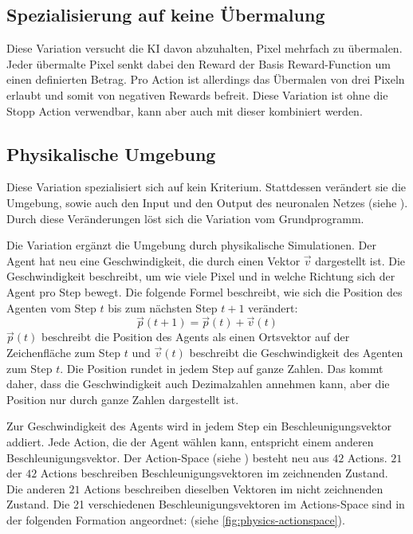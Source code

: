 \subsection{Spezialisierung auf keine Übermalung}\label{sub:m_var_overdraw}
Diese Variation versucht die KI davon abzuhalten, Pixel mehrfach zu übermalen.
Jeder übermalte Pixel senkt dabei den Reward der Basis Reward-Function um einen
definierten Betrag. Pro Action ist allerdings das Übermalen von drei Pixeln
erlaubt und somit von negativen Rewards befreit. Diese Variation ist ohne
die Stopp Action verwendbar, kann aber auch mit dieser kombiniert werden.


\subsection{Physikalische Umgebung}\label{sub:m_var_phy} Diese Variation
spezialisiert sich auf kein Kriterium. Stattdessen verändert sie die Umgebung,
sowie auch den Input und den Output des neuronalen Netzes (siehe
). Durch diese Veränderungen löst sich die Variation vom
Grundprogramm.
 
Die Variation ergänzt die Umgebung durch physikalische Simulationen. Der Agent
hat neu eine Geschwindigkeit, die durch einen Vektor $\vec{v}$ dargestellt ist.
Die Geschwindigkeit beschreibt, um wie viele Pixel und in welche Richtung sich
der Agent pro Step bewegt. Die folgende Formel beschreibt, wie sich die Position
des Agenten vom Step $t$ bis zum nächsten Step $t+1$ verändert:
\[ \vec{p}(t+1) = \vec{p}(t) + \vec{v}(t) \]
$\vec{p}(t)$ beschreibt die Position des Agents als einen Ortsvektor auf der
Zeichenfläche zum Step $t$ und $\vec{v}(t)$ beschreibt die Geschwindigkeit des
Agenten zum Step $t$. Die Position rundet in jedem Step auf ganze Zahlen. Das
kommt daher, dass die Geschwindigkeit auch Dezimalzahlen annehmen kann, aber die
Position nur durch ganze Zahlen dargestellt ist.
 
Zur Geschwindigkeit des Agents wird in jedem Step ein Beschleunigungsvektor
addiert. Jede Action, die der Agent wählen kann, entspricht einem anderen
Beschleunigungsvektor. Der Action-Space (siehe )
besteht neu aus $42$ Actions. $21$ der $42$ Actions beschreiben
Beschleunigungsvektoren im zeichnenden Zustand. Die anderen $21$ Actions
beschreiben dieselben Vektoren im nicht zeichnenden Zustand. Die 21
verschiedenen Beschleunigungsvektoren im Actions-Space sind in der folgenden
Formation angeordnet: (siehe \autoref{fig:physics-actionspace}).
 

